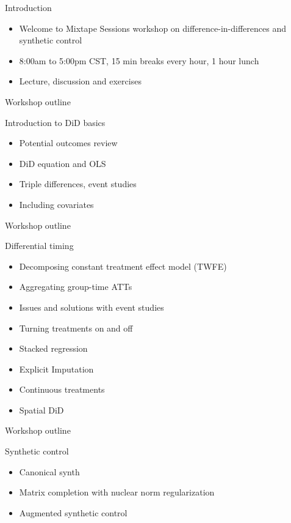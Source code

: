 \documentclass{beamer}
\begin{document}




\begin{frame}{Introduction}

\begin{itemize}
\item Welcome to Mixtape Sessions workshop on difference-in-differences and synthetic control
\item 8:00am to 5:00pm CST, 15 min breaks every hour, 1 hour lunch
\item Lecture, discussion and exercises
\end{itemize}

\end{frame}


\begin{frame}{Workshop outline}

Introduction to DiD basics 
	\begin{itemize}
	\item Potential outcomes review
	\item DiD equation and OLS
	\item Triple differences, event studies
	\item Including covariates
	\end{itemize}

\end{frame}


\begin{frame}{Workshop outline}

 Differential timing
	\begin{itemize}
	\item Decomposing constant treatment effect model (TWFE)
	\item Aggregating group-time ATTs
	\item Issues and solutions with event studies
	\item Turning treatments on and off
	\item Stacked regression
	\item Explicit Imputation
	\item Continuous treatments
	\item Spatial DiD
	\end{itemize}

\end{frame}

\begin{frame}{Workshop outline}

Synthetic control

\begin{itemize}
\item Canonical synth
\item Matrix completion with nuclear norm regularization
\item Augmented synthetic control 
\end{itemize}

\end{frame}
\end{document}
